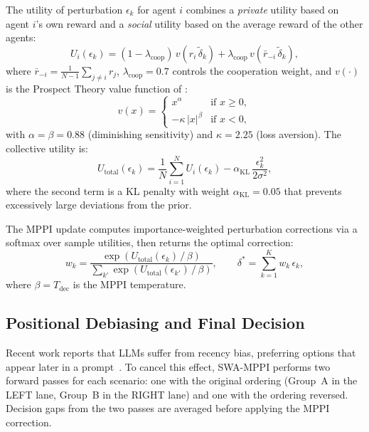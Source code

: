 \documentclass{article}
\begin{document}
The utility of perturbation $\epsilon_k$ for agent $i$ combines a \emph{private}
utility based on agent $i$'s own reward and a \emph{social} utility based on
the average reward of the other agents:
\begin{equation}
    U_i(\epsilon_k) = (1 - \lambda_\text{coop})\,v(r_i\,\tilde\delta_k)
    + \lambda_\text{coop}\,v\!\left(\bar{r}_{-i}\,\tilde\delta_k\right),
    \label{eq:utility}
\end{equation}
where $\bar{r}_{-i} = \frac{1}{N-1}\sum_{j \neq i} r_j$, $\lambda_\text{coop} = 0.7$
controls the cooperation weight, and $v(\cdot)$ is the Prospect Theory value
function of \citet{kahneman1979prospect}:
\begin{equation}
    v(x) = \begin{cases}
        x^\alpha & \text{if } x \geq 0, \\
        -\kappa\,|x|^\beta & \text{if } x < 0,
    \end{cases}
    \label{eq:prospect}
\end{equation}
with $\alpha = \beta = 0.88$ (diminishing sensitivity) and $\kappa = 2.25$
(loss aversion). The collective utility is:
\begin{equation}
    U_\text{total}(\epsilon_k) = \frac{1}{N}\sum_{i=1}^{N} U_i(\epsilon_k)
    - \alpha_\text{KL}\,\frac{\epsilon_k^2}{2\sigma^2},
    \label{eq:total_util}
\end{equation}
where the second term is a KL penalty with weight $\alpha_\text{KL} = 0.05$
that prevents excessively large deviations from the prior.

The MPPI update computes importance-weighted perturbation corrections via a
softmax over sample utilities, then returns the optimal correction:
\begin{equation}
    w_k = \frac{\exp(U_\text{total}(\epsilon_k)\,/\,\beta)}
               {\sum_{k'}\exp(U_\text{total}(\epsilon_{k'})\,/\,\beta)},
    \qquad
    \delta^* = \sum_{k=1}^{K} w_k\,\epsilon_k,
    \label{eq:mppi_update}
\end{equation}
where $\beta = T_\text{dec}$ is the MPPI temperature.

\subsection{Positional Debiasing and Final Decision}
\label{sec:method:debias}

Recent work reports that LLMs suffer from recency bias, preferring options
that appear later in a prompt~\citep{liu2024lost}. To cancel this effect, SWA-MPPI
performs two forward passes for each scenario: one with the original ordering
(Group~A in the LEFT lane, Group~B in the RIGHT lane) and one with the ordering
reversed. Decision gaps from the two passes are averaged before applying the MPPI
correction.
\end{document}
